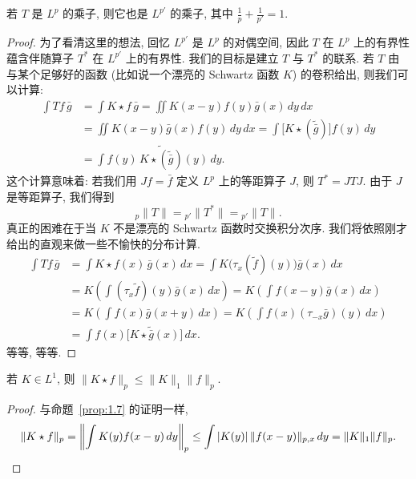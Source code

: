 \begin{lemma}\label{lem:1.8}
若 $T$ 是 $L^p$ 的乘子, 则它也是 $L^{p'}$ 的乘子, 其中 $\frac{1}{p}+\frac{1}{p'}=1$.
\end{lemma}

\begin{proof}
为了看清这里的想法, 回忆 $L^{p'}$ 是 $L^p$ 的对偶空间, 因此 $T$ 在 $L^p$ 上的有界性蕴含伴随算子 $T^{\ast}$ 在 $L^{p'}$ 上的有界性. 我们的目标是建立 $T$ 与 $T^{\ast}$ 的联系. 若 $T$ 由与某个足够好的函数 (比如说一个漂亮的 Schwartz 函数 $K$) 的卷积给出, 则我们可以计算:
\begin{align*}
\int Tf\,\bar{g}&=\int K\star f\,\bar{g}
=\iint K(x-y)f(y)\bar{g}(x)\,dy\,dx \\
&=\iint K(x-y)\bar{g}(x)f(y)\,dy\,dx
=\int\bigl[K\star(\widetilde{\bar{g}})\bigr]f(y)\,dy \\
&=\int f(y)\,\widetilde{K\star(\widetilde{\bar{g}})}(y)\,dy.
\end{align*}
这个计算意味着: 若我们用 $Jf=\bar{f}$ 定义 $L^p$ 上的等距算子 $J$, 则 $T^{\ast}=JTJ$. 由于 $J$ 是等距算子, 我们得到
\[
{}_p\|T\|={}_{p'}\|T^{\ast}\|={}_{p'}\|T\|.
\]
真正的困难在于当 $K$ 不是漂亮的 Schwartz 函数时交换积分次序. 我们将依照刚才给出的直观来做一些不愉快的分布计算.
\begin{align*}
\int Tf\,\bar{g}&=\int K\star f(x)\,\bar{g}(x)\,dx
=\int K\bigl(\tau_x(\tilde{f})(y)\bigr)\bar{g}(x)\,dx \\
&=K\left(\int(\tau_x\tilde{f})(y)\bar{g}(x)\,dx\right)
=K\left(\int f(x-y)\bar{g}(x)\,dx\right) \\
&=K\left(\int f(x)\bar{g}(x+y)\,dx\right)
=K\left(\int f(x)(\tau_{-x}\bar{g})(y)\,dx\right) \\
&=\int f(x)\bigl[K\star\tilde{\bar{g}}(x)\bigr]\,dx.
\end{align*}
等等, 等等.
\end{proof}

\addtocounter{mtthm}{1}

\begin{lemma}\label{lem:1.10}
若 $K\in L^1$, 则 $\|K\star f\|_p\leq\|K\|_1\|f\|_p$.
\end{lemma}

\begin{proof}
与命题~\ref{prop:1.7} 的证明一样,
\[
\|K\star f\|_p=\left\|\int K(y)f(x-y)\,dy\right\|_p
\leq\int|K(y)|\,\|f(x-y)\|_{p,x}\,dy=\|K\|_1\|f\|_p. \qedhere
\]
\end{proof}

